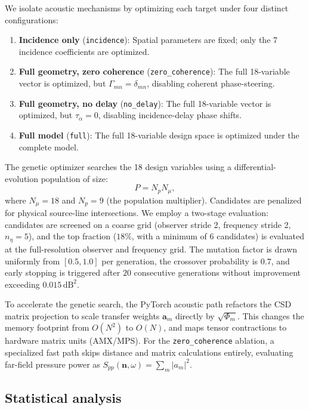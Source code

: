 \documentclass[11pt]{article}
\newcommand{\vect}[1]{\bm{#1}}
\begin{document}
We isolate acoustic mechanisms by optimizing each target under four distinct configurations:
\begin{enumerate}
    \item \textbf{Incidence only} (\texttt{incidence}): Spatial parameters are fixed; only the 7 incidence coefficients are optimized.
    \item \textbf{Full geometry, zero coherence} (\texttt{zero\_coherence}): The full 18-variable vector is optimized, but $\Gamma_{mn} = \delta_{mn}$, disabling coherent phase-steering.
    \item \textbf{Full geometry, no delay} (\texttt{no\_delay}): The full 18-variable vector is optimized, but $\tau_\alpha = 0$, disabling incidence-delay phase shifts.
    \item \textbf{Full model} (\texttt{full}): The full 18-variable design space is optimized under the complete model.
\end{enumerate}

The genetic optimizer searches the 18 design variables using a differential-evolution population of size:
\begin{equation}
    P=N_pN_\mu,
\label{eq:population_size}
\end{equation}
where $N_\mu = 18$ and $N_p = 9$ (the population multiplier). Candidates are penalized for physical source-line intersections. We employ a two-stage evaluation: candidates are screened on a coarse grid (observer stride 2, frequency stride 2, $n_\eta = 5$), and the top fraction ($18\%$, with a minimum of 6 candidates) is evaluated at the full-resolution observer and frequency grid. The mutation factor is drawn uniformly from $[0.5, 1.0]$ per generation, the crossover probability is $0.7$, and early stopping is triggered after $20$ consecutive generations without improvement exceeding $0.015\,\mathrm{dB}^2$.

To accelerate the genetic search, the PyTorch acoustic path refactors the CSD matrix projection to scale transfer weights $\vect{a}_m$ directly by $\sqrt{\Phi_m}$. This changes the memory footprint from $O(N^2)$ to $O(N)$, and maps tensor contractions to hardware matrix units (AMX/MPS). For the \texttt{zero\_coherence} ablation, a specialized fast path skips distance and matrix calculations entirely, evaluating far-field pressure power as $S_{pp}(\vect{n},\omega) = \sum_{m} |a_{m}|^2$.

\subsection{Statistical analysis}
\end{document}
